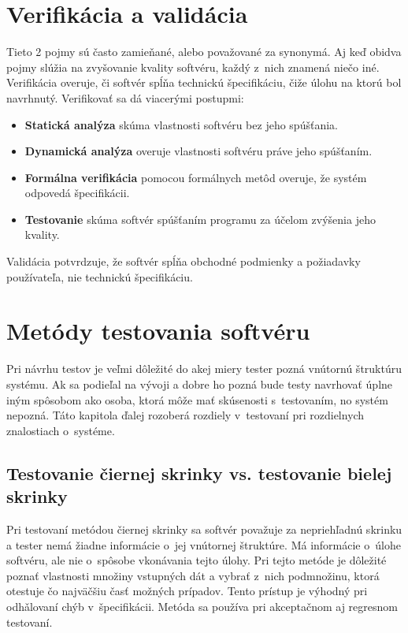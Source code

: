 \section{Verifikácia a validácia}
Tieto 2 pojmy sú často zamieňané, alebo považované za synonymá.
Aj keď obidva pojmy slúžia na zvyšovanie kvality softvéru, každý z~nich znamená niečo iné.
Verifikácia overuje, či softvér spĺňa technickú špecifikáciu, čiže úlohu na ktorú bol navrhnutý.
Verifikovať sa dá viacerými postupmi:
\begin{itemize}
	\item \textbf{Statická analýza} skúma vlastnosti softvéru bez jeho spúšťania.
	\item \textbf{Dynamická analýza} overuje vlastnosti softvéru práve jeho spúšťaním.
	\item \textbf{Formálna verifikácia} pomocou formálnych metôd overuje, že systém odpovedá špecifikácii.
	\item \textbf{Testovanie} skúma softvér spúšťaním programu za účelom zvýšenia jeho kvality.
\end{itemize}

Validácia potvrdzuje, že softvér spĺňa obchodné podmienky a požiadavky používateľa, nie technickú špecifikáciu.

\section{Metódy testovania softvéru}
Pri návrhu testov je veľmi dôležité do akej miery tester pozná vnútornú štruktúru systému.
Ak sa podieľal na vývoji a dobre ho pozná bude testy navrhovať úplne iným spôsobom ako osoba, ktorá môže mať skúsenosti s~testovaním, no systém nepozná.
Táto kapitola ďalej rozoberá rozdiely v~testovaní pri rozdielnych znalostiach o~systéme.

\subsection{Testovanie čiernej skrinky vs. testovanie bielej skrinky}
\label{blackbox_vs_whitebox}
Pri testovaní metódou čiernej skrinky sa softvér považuje za nepriehľadnú skrinku a tester nemá žiadne informácie o~jej vnútornej štruktúre.
Má informácie o~úlohe softvéru, ale nie o~spôsobe vkonávania tejto úlohy.
Pri tejto metóde je dôležité poznať vlastnosti množiny vstupných dát a vybrať z~nich podmnožinu, ktorá otestuje čo najväčšiu časť možných prípadov.
Tento prístup je výhodný pri odhǎlovaní chýb v~špecifikácii.
Metóda sa používa pri akceptačnom aj regresnom testovaní.

